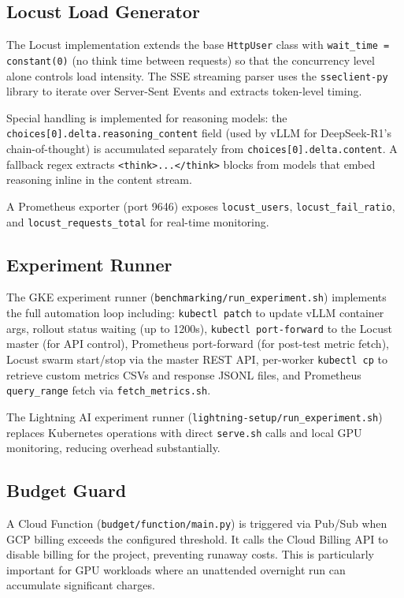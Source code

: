 \documentclass[a4paper,12pt]{report}
\begin{document}
\subsection{Locust Load Generator}

The Locust implementation extends the base \texttt{HttpUser} class with \texttt{wait\_time = constant(0)} (no think time between requests) so that the concurrency level alone controls load intensity. The SSE streaming parser uses the \texttt{sseclient-py} library to iterate over Server-Sent Events and extracts token-level timing.

Special handling is implemented for reasoning models: the \texttt{choices[0].delta.reasoning\_content} field (used by vLLM for DeepSeek-R1's chain-of-thought) is accumulated separately from \texttt{choices[0].delta.content}. A fallback regex extracts \texttt{<think>...</think>} blocks from models that embed reasoning inline in the content stream.

A Prometheus exporter (port 9646) exposes \texttt{locust\_users}, \texttt{locust\_fail\_ratio}, and \texttt{locust\_requests\_total} for real-time monitoring.

\subsection{Experiment Runner}

The GKE experiment runner (\texttt{benchmarking/run\_experiment.sh}) implements the full automation loop including: \texttt{kubectl patch} to update vLLM container args, rollout status waiting (up to 1200s), \texttt{kubectl port-forward} to the Locust master (for API control), Prometheus port-forward (for post-test metric fetch), Locust swarm start/stop via the master REST API, per-worker \texttt{kubectl cp} to retrieve custom metrics CSVs and response JSONL files, and Prometheus \texttt{query\_range} fetch via \texttt{fetch\_metrics.sh}.

The Lightning AI experiment runner (\texttt{lightning-setup/run\_experiment.sh}) replaces Kubernetes operations with direct \texttt{serve.sh} calls and local GPU monitoring, reducing overhead substantially.

\subsection{Budget Guard}

A Cloud Function (\texttt{budget/function/main.py}) is triggered via Pub/Sub when GCP billing exceeds the configured threshold. It calls the Cloud Billing API to disable billing for the project, preventing runaway costs. This is particularly important for GPU workloads where an unattended overnight run can accumulate significant charges.
\end{document}
